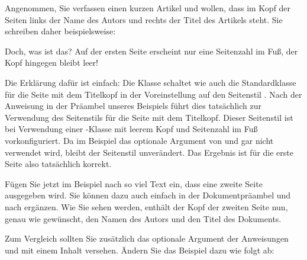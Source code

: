 \begin{Example}
  Angenommen, Sie verfassen einen kurzen Artikel und wollen, dass im Kopf der
  Seiten links der Name des Autors und rechts der Titel des Artikels
  steht. Sie schreiben daher beispielsweise:%
  {}%
  Doch, was ist das? Auf der ersten Seite erscheint nur eine Seitenzahl im
  Fuß, der Kopf hingegen bleibt leer!

  Die Erklärung dafür ist einfach: Die Klasse  schaltet wie
  auch die Standardklasse  für die Seite mit dem Titelkopf in
  der Voreinstellung auf den Seitenstil . Nach der Anweisung
   in der Präambel
  unseres Beispiels führt dies tatsächlich zur Verwendung des Seitenstils
   für die Seite mit dem
  Titelkopf. Dieser Seitenstil ist bei Verwendung einer \KOMAScript-Klasse mit
  leerem Kopf und Seitenzahl im Fuß vorkonfiguriert. Da im Beispiel das
  optionale Argument von  und  gar nicht verwendet
  wird, bleibt der Seitenstil 
  unverändert. Das Ergebnis ist für die erste Seite also tatsächlich korrekt.

  Fügen Sie jetzt im Beispiel nach  so viel
  Text ein, dass eine zweite Seite ausgegeben wird. Sie können dazu auch
  einfach  in der
  Dokumentpräambel und  nach
   ergänzen. Wie Sie sehen werden, enthält der
  Kopf der zweiten Seite nun, genau wie gewünscht, den Namen des Autors und
  den Titel des Dokuments.

  Zum Vergleich sollten Sie zusätzlich das optionale Argument der Anweisungen
   und  mit einem Inhalt versehen. Ändern Sie das
  Beispiel dazu wie folgt ab:
\end{Example}
